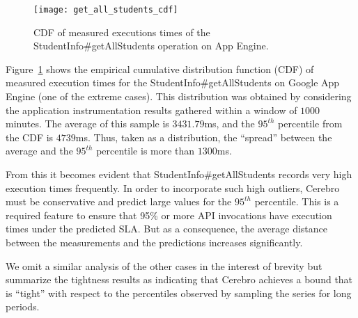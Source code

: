 
\begin{figure}
\centering
\texttt{[image: get\_all\_students\_cdf]}
\caption{CDF of measured executions times of the StudentInfo\#getAllStudents operation on App Engine.}
\label{fig:get_all_students_cdf}
\vspace{-0.2in}
\end{figure}

Figure~\ref{fig:get_all_students_cdf} shows the empirical cumulative
distribution function (CDF) of measured execution times for the 
StudentInfo\#getAllStudents on
Google App Engine (one of the extreme cases). 
This distribution was obtained by considering the application instrumentation 
results gathered within a window of $1000$ minutes. 
The average of this sample is $3431.79$ms, and the $95^{th}$ percentile
from the CDF is $4739$ms.  Thus, taken as a distribution, the ``spread''
between the average and the $95^{th}$ percentile is more
than $1300$ms.  



From this it becomes evident that StudentInfo\#getAll\-Students 
records very high execution times frequently. 
In order to incorporate such high outliers, Cerebro must be conservative 
and predict large values for
the $95^{th}$ percentile. This is a required feature to ensure that 95\% or more 
API invocations have
execution times under the predicted SLA. But as a consequence, the average 
distance between the 
measurements and the predictions increases significantly.

We omit a similar analysis of the other cases in the interest of brevity 
but summarize the tightness results as indicating that Cerebro achieves a
bound that is ``tight'' with respect to the percentiles observed by sampling
the series for long periods. 


